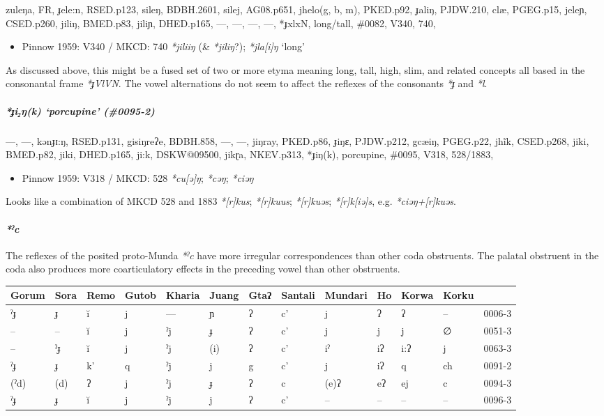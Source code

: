 \documentclass[a4paper,]{article}
\providecommand{\tightlist}{%
  \setlength{\itemsep}{0pt}\setlength{\parskip}{0pt}}
\let\oldparagraph\paragraph
\renewcommand{\paragraph}[1]{\oldparagraph{#1}\mbox{}}
\let\oldsubparagraph\subparagraph
\renewcommand{\subparagraph}[1]{\oldsubparagraph{#1}\mbox{}}
\begin{document}
zuleŋa, FR, ɟele:n, RSED.p123, sileŋ, BDBH.2601, silej, AG08.p651,
jhelo(g, b, m), PKED.p92, ɟaliŋ, PJDW.210, clæ, PGEG.p15, jeleɲ,
CSED.p260, jiliŋ, BMED.p83, jiliɲ, DHED.p165, ---, ---, ---, ---,
*ɟxlxN, long/tall, \#0082, V340, 740,

\begin{itemize}
\tightlist
\item
  Pinnow 1959: V340 / MKCD: 740 \emph{*jiliiŋ} (\& \emph{*jiliŋ}?);
  \emph{*jla{[}i{]}ŋ} `long'
\end{itemize}

As discussed above, this might be a fused set of two or more etyma
meaning long, tall, high, slim, and related concepts all based in the
consonantal frame \emph{*ɟVlVN}. The vowel alternations do not seem to
affect the reflexes of the consonants \emph{*ɟ} and \emph{*l}.

\subparagraph{\texorpdfstring{\emph{*ɟi₂ŋ(k)} `porcupine'
(\#0095-2)}{*ɟi₂ŋ(k) porcupine (\#0095-2)}}\label{ux25fiux14bk-porcupine-0095-2-1}

---, ---, kənɟɪ:ŋ, RSED.p131, gisiŋreʔe, BDBH.858, ---, ---, jiŋray,
PKED.p86, ɟiŋɛ, PJDW.p212, gcæiŋ, PGEG.p22, jhĩk, CSED.p268, jiki,
BMED.p82, jiki, DHED.p165, ji:k, DSKW@09500, jikɽa, NKEV.p313, *ɟiŋ(k),
porcupine, \#0095, V318, 528/1883,

\begin{itemize}
\tightlist
\item
  Pinnow 1959: V318 / MKCD: 528 \emph{*cu{[}ə{]}ŋ}; \emph{*cəŋ};
  \emph{*ciəŋ}
\end{itemize}

Looks like a combination of MKCD 528 and 1883 \emph{*{[}r{]}kus};
\emph{*{[}r{]}kuus}; \emph{*{[}r{]}kuəs}; \emph{*{[}r{]}k{[}iə{]}s},
e.g. \emph{*ciəŋ+{[}r{]}kuəs}.

\paragraph{\texorpdfstring{\emph{*ˀc}}{*ˀc}}\label{ux2c0c}

The reflexes of the posited proto-Munda \emph{*ˀc} have more irregular
correspondences than other coda obstruents. The palatal obstruent in the
coda also produces more coarticulatory effects in the preceding vowel
than other obstruents.

\begin{longtable}[]{@{}lllllllllllll@{}}
\toprule
Gorum & Sora & Remo & Gutob & Kharia & Juang & Gtaʔ & Santali & Mundari
& Ho & Korwa & Korku &\tabularnewline
\midrule
\endhead
ˀɟ & ɟ & ĭ & j & --- & ɲ & ʔ & c' & j & ʔ & ʔ & -- &
0006-3\tabularnewline
-- & -- & ĭ & j & ˀj & ɟ & ʔ & c' & j & j & j & ∅ &
0051-3\tabularnewline
-- & ˀɟ & ĭ & j & ˀj & (i) & ʔ & c' & iˀ & iʔ & i:ʔ & j &
0063-3\tabularnewline
ˀɟ & ɟ & k' & q & ˀj & j & g & c' & j & iʔ & q & ch &
0091-2\tabularnewline
(ˀd) & (d) & ʔ & j & ˀj & ɟ & ʔ & c & (e)ʔ & eʔ & ej & c &
0094-3\tabularnewline
ˀɟ & ɟ & ĭ & j & ˀj & j & ʔ & c' & -- & -- & -- & -- &
0096-3\tabularnewline
\bottomrule
\end{longtable}
\end{document}
